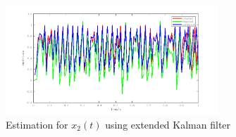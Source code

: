 \documentclass[conference]{IEEEtran}
\begin{document}
	\begin{figure}[htbp]
		\centering
		\includegraphics[width=8cm]{fig4.png}
		\caption{Estimation for $x_{2}(t)$ using extended Kalman filter}
		\label{fig4}
	\end{figure}
	
	\newpage
	
	\newpage
	
	
	
	
\end{document}
